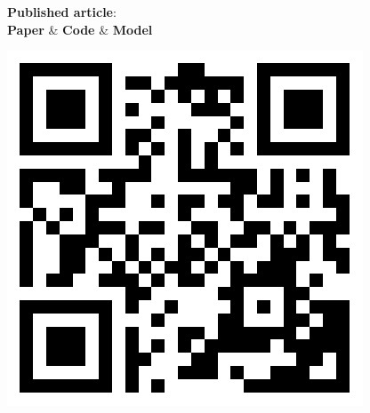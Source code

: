 \documentclass[portrait,a0paper,fontscale=0.292]{baposter}
\begin{document}
\begin{poster}
{\begin{minipage}[t]{0.5\textwidth}
        \vspace{0.2em}\hspace{5.0em}\begin{minipage}{0.4\textwidth}
            \begin{center}
                \textbf{Published article}: \\
                \vspace{0.5em}\textbf{Paper} \& \textbf{Code} \& \textbf{Model}
            \end{center}
        \end{minipage}
        \begin{minipage}{0.20\linewidth}
            \begin{center}
                \includegraphics[width=\linewidth]{figures/qrcode.png}
            \end{center}
        \end{minipage}
    \end{minipage}

}



\end{poster}
\end{document}

